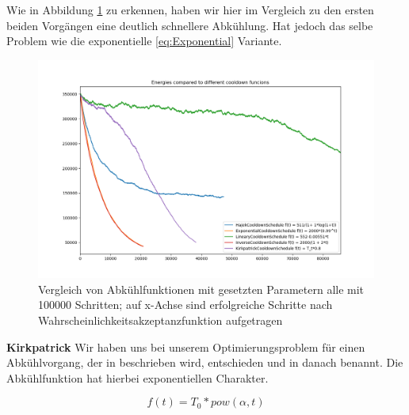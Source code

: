 Wie in Abbildung \ref{pic:Cool Down Comparisson} zu erkennen, haben wir hier im Vergleich zu den ersten beiden Vorgängen
eine deutlich schnellere Abkühlung. Hat jedoch das selbe Problem wie die exponentielle \ref{eq:Exponential} Variante.

\begin{figure}[H]
    \centering
    \includegraphics[width=\linewidth]{content/simulatedAnnealing/Bilder/Energy_Cooldown_compared_steps_85771.png}
    \caption{Vergleich von Abkühlfunktionen mit gesetzten Parametern
            alle mit 100000 Schritten; auf x-Achse sind erfolgreiche Schritte nach Wahrscheinlichkeitsakzeptanzfunktion
            aufgetragen}
    \label{pic:Cool Down Comparisson}
\end{figure}


\textbf{Kirkpatrick}
Wir haben uns bei unserem Optimierungsproblem für einen Abkühlvorgang, der in \cite{Kirkpatrick671} beschrieben wird, 
entschieden und in danach benannt. Die Abkühlfunktion hat hierbei exponentiellen Charakter. 

\begin{tcolorbox}[rightrule=3mm, rounded corners=east]
    \begin{equation}\label{eq:ExponentialKirkpatrick}
        f(t) = T_0 * pow(\alpha,t)
      \end{equation}
\end{tcolorbox}

